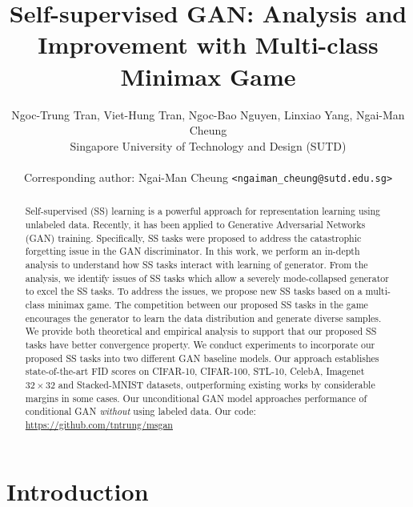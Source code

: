 \documentclass{article}
\title{Self-supervised GAN: Analysis and Improvement with Multi-class Minimax Game}
\author{Ngoc-Trung Tran, Viet-Hung Tran, Ngoc-Bao Nguyen, Linxiao Yang, Ngai-Man Cheung\\
  Singapore University of Technology and Design (SUTD)\\
  \\
  Corresponding author: Ngai-Man Cheung \texttt{<ngaiman\_cheung@sutd.edu.sg>}\\
}
\begin{document}
\maketitle

\begin{abstract}

Self-supervised (SS) learning is a powerful approach for representation learning using unlabeled data. Recently, it has been applied to Generative Adversarial Networks (GAN) training. Specifically, SS tasks were proposed to address the catastrophic forgetting issue in the GAN discriminator. In this work, we perform an in-depth analysis to understand how SS tasks interact with learning of generator. From the analysis, we identify issues of SS tasks which allow a severely mode-collapsed generator to excel the SS tasks. To address the issues, we propose new SS tasks based on a multi-class minimax game. The competition between our proposed SS tasks in the game encourages the generator to learn the data distribution and generate diverse samples. We provide both theoretical and empirical analysis to support that our proposed SS tasks have better convergence property. We conduct experiments to incorporate our proposed SS tasks into two different GAN baseline models. Our approach establishes state-of-the-art FID scores on CIFAR-10, CIFAR-100, STL-10, CelebA, Imagenet $32\times32$ and Stacked-MNIST datasets, outperforming existing works by considerable margins in some cases. Our unconditional GAN model approaches performance of conditional GAN {\em without} using labeled data.  Our code:  \url{https://github.com/tntrung/msgan}






\end{abstract}
 
\section{Introduction}
\end{document}
